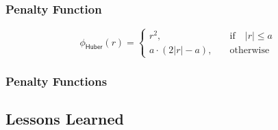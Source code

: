 \begin{frame}
  \frametitle{Penalty Function \cont}

  
  \begin{displaymath}
    \phi_\mathsf{Huber}(r) = 
      \left\{
        \begin{array}{cl}
          r^2,            & \quad \mbox{if} \quad |r| \leq a \\
          a\cdot(2|r|-a), & \quad \mbox{otherwise}
        \end{array}
      \right.
  \end{displaymath}

  \begin{figure}
  \end{figure}
\end{frame}


\begin{frame}
  \frametitle{Penalty Functions \cont}

  \begin{figure}
  \end{figure}
\end{frame}


\subsection{Lessons Learned}

